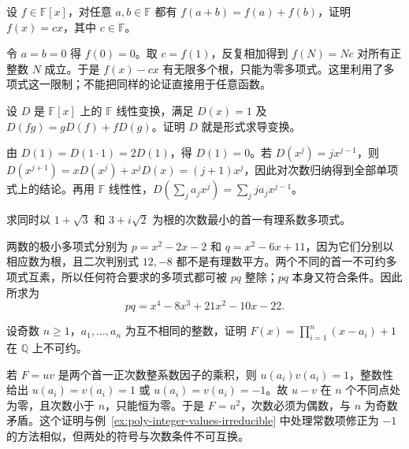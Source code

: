 \begin{example}
\label{ex:poly-training-additive}
设 $f\in\mathbb F[x]$，对任意 $a,b\in\mathbb F$ 都有 $f(a+b)=f(a)+f(b)$，证明 $f(x)=cx$，其中 $c\in\mathbb F$。
\end{example}
\begin{solve}
令 $a=b=0$ 得 $f(0)=0$。取 $c=f(1)$，反复相加得到 $f(N)=Nc$ 对所有正整数 $N$ 成立。于是 $f(x)-cx$ 有无限多个根，只能为零多项式。这里利用了多项式这一限制；不能把同样的论证直接用于任意函数。
\end{solve}

\begin{example}
\label{ex:poly-training-derivation}
设 $D$ 是 $\mathbb F[x]$ 上的 $\mathbb F$ 线性变换，满足 $D(x)=1$ 及 $D(fg)=gD(f)+fD(g)$。证明 $D$ 就是形式求导变换。
\end{example}
\begin{solve}
由 $D(1)=D(1\cdot1)=2D(1)$，得 $D(1)=0$。若 $D(x^j)=jx^{j-1}$，则 $D(x^{j+1})=xD(x^j)+x^jD(x)=(j+1)x^j$，因此对次数归纳得到全部单项式上的结论。再用 $\mathbb F$ 线性性，$D(\sum_j a_jx^j)=\sum_j ja_jx^{j-1}$。
\end{solve}

\begin{example}
\label{ex:poly-training-minimal-common-roots}
求同时以 $1+\sqrt3$ 和 $3+i\sqrt2$ 为根的次数最小的首一有理系数多项式。
\end{example}
\begin{solve}
两数的极小多项式分别为 $p=x^2-2x-2$ 和 $q=x^2-6x+11$，因为它们分别以相应数为根，且二次判别式 $12,-8$ 都不是有理数平方。两个不同的首一不可约多项式互素，所以任何符合要求的多项式都可被 $pq$ 整除；$pq$ 本身又符合条件。因此所求为
\[
    pq=x^4-8x^3+21x^2-10x-22.
\]
\end{solve}

\begin{example}
\label{ex:poly-training-odd-irreducible}
设奇数 $n\geq1$，$a_1,\ldots,a_n$ 为互不相同的整数，证明 $F(x)=\prod_{i=1}^n(x-a_i)+1$ 在 $\mathbb Q$ 上不可约。
\end{example}
\begin{solve}
若 $F=uv$ 是两个首一正次数整系数因子的乘积，则 $u(a_i)v(a_i)=1$，整数性给出 $u(a_i)=v(a_i)=1$ 或 $u(a_i)=v(a_i)=-1$。故 $u-v$ 在 $n$ 个不同点处为零，且次数小于 $n$，只能恒为零。于是 $F=u^2$，次数必须为偶数，与 $n$ 为奇数矛盾。这个证明与例~\ref{ex:poly-integer-values-irreducible} 中处理常数项修正为 $-1$ 的方法相似，但两处的符号与次数条件不可互换。
\end{solve}

